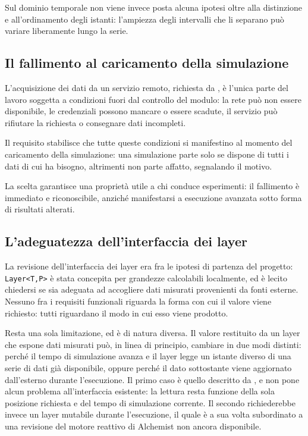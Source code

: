 Sul dominio temporale non viene invece posta alcuna ipotesi oltre alla distinzione e
all'ordinamento degli istanti: l'ampiezza degli intervalli che li separano può variare
liberamente lungo la serie.

\subsection{Il fallimento al caricamento della simulazione}
\label{subsec:momento-del-fallimento}

L'acquisizione dei dati da un servizio remoto, richiesta da , è l'unica parte del
lavoro soggetta a condizioni fuori dal controllo del modulo: la rete può non essere
disponibile, le credenziali possono mancare o essere scadute, il servizio può rifiutare la
richiesta o consegnare dati incompleti.

Il requisito  stabilisce che tutte queste condizioni si manifestino al momento del
caricamento della simulazione: una simulazione parte solo se dispone di tutti i dati di
cui ha bisogno, altrimenti non parte affatto, segnalando il motivo.

La scelta garantisce una proprietà utile a chi conduce esperimenti: il fallimento è
immediato e riconoscibile, anziché manifestarsi a esecuzione avanzata sotto forma di
risultati alterati.

\subsection{L'adeguatezza dell'interfaccia dei layer}
\label{subsec:api-sufficiente}

La revisione dell'interfaccia dei layer era fra le ipotesi di partenza
del progetto: \texttt{Layer<T,P>} è stata concepita per grandezze calcolabili
localmente, ed è lecito chiedersi se sia adeguata ad accogliere dati misurati
provenienti da fonti esterne. %
Nessuno fra i requisiti funzionali riguarda la forma con cui il valore viene richiesto:
tutti riguardano il modo in cui esso viene prodotto.

Resta una sola limitazione, ed è di natura diversa. Il valore restituito da un layer che
espone dati misurati può, in linea di principio, cambiare in due modi distinti: perché il
tempo di simulazione avanza e il layer legge un istante diverso di una serie di dati già
disponibile, oppure perché il dato sottostante viene aggiornato dall'esterno durante
l'esecuzione. Il primo caso è quello descritto da , e non pone alcun problema
all'interfaccia esistente: la lettura resta funzione della sola posizione richiesta e del
tempo di simulazione corrente. Il secondo richiederebbe invece un layer mutabile durante
l'esecuzione, il quale è a sua volta subordinato a una revisione del motore reattivo di
Alchemist non ancora disponibile.

